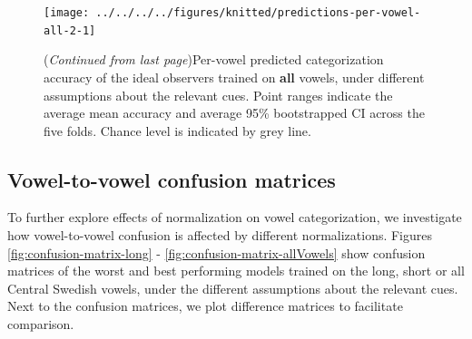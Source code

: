 \documentclass[utf8]{frontiers_suppmat} %
\begin{document}
\begin{figure}[H]

{\centering \texttt{[image: ../../../../figures/knitted/predictions-per-vowel-all-2-1]} 

}

\caption{(\emph{Continued from last page})Per-vowel predicted categorization accuracy of the ideal observers trained on \textbf{all} vowels, under different assumptions about the relevant cues. Point ranges indicate the average mean accuracy and average 95\% bootstrapped CI across the five folds. Chance level is indicated by grey line.}\label{fig:predictions-per-vowel-all-2}
\end{figure}

\hypertarget{sec:confusion}{%
\subsection{Vowel-to-vowel confusion matrices}\label{sec:confusion}}
To further explore effects of normalization on vowel categorization, we investigate how vowel-to-vowel confusion is affected by different normalizations. Figures \ref{fig:confusion-matrix-long} - \ref{fig:confusion-matrix-allVowels} show confusion matrices of the worst and best performing models trained on the long, short or all Central Swedish vowels, under the different assumptions about the relevant cues. Next to the confusion matrices, we plot difference matrices to facilitate comparison.
\end{document}

